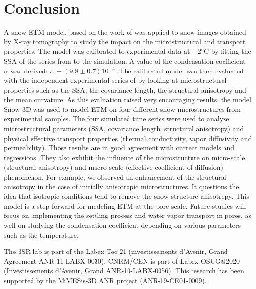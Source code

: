 \documentclass[draft,ms]{agujournal2019}
\begin{document}
\section{Conclusion}
\label{sec:conclusion}

A snow ETM model, based on the work of  was applied to snow images obtained by X-ray tomography to study the impact on the microstructural and transport properties. The model was calibrated to experimental data at – 2°C by fitting the SSA of the series from  to the simulation. A value of the condensation coefficient $\alpha$ was derived: $\alpha = ( 9.8 \pm 0.7) 10^{-4}$. The calibrated model was then evaluated with the independent experimental series of  by looking at microstructural properties such as the SSA, the covariance length, the structural anisotropy and the mean curvature. As this evaluation raised very encouraging results, the model Snow-3D was used to model ETM on four different snow microstructures from experimental samples. The four simulated time series were used to analyze microstructural parameters (SSA, covariance length, structural anisotropy) and physical effective transport properties (thermal conductivity, vapor diffusivity and permeability). Those results are in good agreement with current models and regressions. They also exhibit the influence of the microstructure on micro-scale (structural anisotropy) and macro-scale (effective coefficient of diffusion) phenomenon. For example, we observed an enhancement of the structural anisotropy in the case of initially anisotropic microstructures. It questions the idea that isotropic conditions tend to remove the snow structure anisotropy. This model is a step forward for modeling ETM at the pore scale. Future studies will focus on implementing the settling process and water vapor transport in pores, as well on studying the condensation coefficient depending on various parameters such as the temperature.

\acknowledgments
The 3SR lab is part of the Labex Tec 21 (investissements d'Avenir, Grand Agreement ANR-11-LABX-0030). CNRM/CEN is part of Labex OSUG@2020 (Investissements d'Avenir, Grand ANR-10-LABX-0056). This research has been supported by the MiMESis-3D ANR project (ANR-19-CE01-0009).


\end{document}
